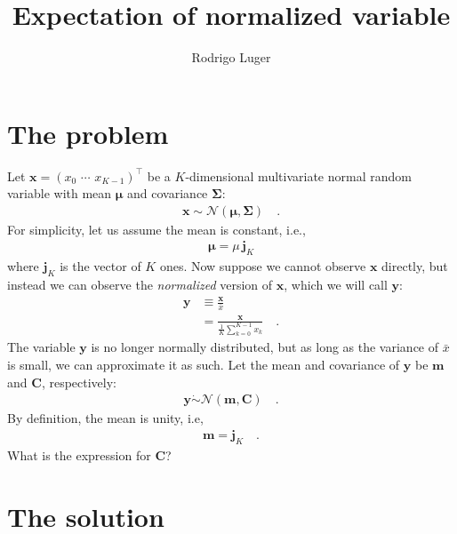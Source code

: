 \documentclass[modern]{aastex62}
\begin{document}
\title{%
    \textbf{
        Expectation of normalized variable
    }
}

\author{Rodrigo Luger}

\section{The problem}

Let $\mathbf{x} = \left( x_0 \,\, \cdots \,\, x_{K-1} \right)^\top$
be a $K$-dimensional multivariate normal random variable with mean $\pmb{\mu}$
and covariance $\pmb{\Sigma}$:
%
\begin{align}
    \mathbf{x} \sim \mathcal{N}\left( \pmb{\mu}, \pmb{\Sigma} \right)
    \quad.
\end{align}
%
For simplicity, let us assume the mean is constant, i.e.,
%
\begin{align}
    \pmb{\mu} = \mu \, \mathbf{j}_K
\end{align}
%
where $\mathbf{j}_K$ is the vector of $K$ ones.
%
Now suppose we cannot observe $\mathbf{x}$ directly, but instead we can
observe the \emph{normalized} version of $\mathbf{x}$, which we will call
$\mathbf{y}$:
%
\begin{align}
    \mathbf{y}
     & \equiv \frac{\mathbf{x}}{\bar{x}}
    \nonumber                                                      \\[0.5em]
     & = \frac{\mathbf{x}}{\frac{1}{K}\sum\limits_{k=0}^{K-1} x_k}
    \quad.
\end{align}
%
The variable $\mathbf{y}$ is no longer normally distributed, but as long as
the variance of $\bar{x}$ is small, we can approximate it as such. Let the mean
and covariance of $\mathbf{y}$ be $\mathbf{m}$ and $\mathbf{C}$, respectively:
%
\begin{align}
    \mathbf{y} \mathrel{\dot\sim} \mathcal{N}\left( \mathbf{m}, \mathbf{C} \right)
    \quad.
\end{align}
%
By definition, the mean is unity, i.e,
%
\begin{align}
    \mathbf{m} = \mathbf{j}_K
    \quad.
\end{align}
%
What is the expression for $\mathbf{C}$?

\section{The solution}
\end{document}

